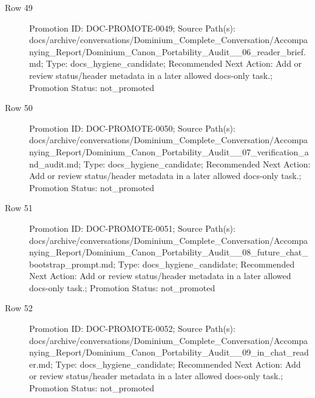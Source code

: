 \documentclass[10.5pt,a4paper,openany]{book}
\begin{document}
\begin{description}
\item[Row 49] Promotion ID: DOC-\allowbreak{}PROMOTE-\allowbreak{}0049; Source Path(s): docs/\allowbreak{}archive/\allowbreak{}conversations/\allowbreak{}Dominium\_\allowbreak{}Complete\_\allowbreak{}Conversation/\allowbreak{}Accompanying\_\allowbreak{}Report/\allowbreak{}Dominium\_\allowbreak{}Canon\_\allowbreak{}Portability\_\allowbreak{}Audit\_\allowbreak{}\_\allowbreak{}06\_\allowbreak{}reader\_\allowbreak{}brief.\allowbreak{}md; Type: docs\_\allowbreak{}hygiene\_\allowbreak{}candidate; Recommended Next Action: Add or review status/\allowbreak{}header metadata in a later allowed docs-\allowbreak{}only task.\allowbreak{}; Promotion Status: not\_\allowbreak{}promoted
\item[Row 50] Promotion ID: DOC-\allowbreak{}PROMOTE-\allowbreak{}0050; Source Path(s): docs/\allowbreak{}archive/\allowbreak{}conversations/\allowbreak{}Dominium\_\allowbreak{}Complete\_\allowbreak{}Conversation/\allowbreak{}Accompanying\_\allowbreak{}Report/\allowbreak{}Dominium\_\allowbreak{}Canon\_\allowbreak{}Portability\_\allowbreak{}Audit\_\allowbreak{}\_\allowbreak{}07\_\allowbreak{}verification\_\allowbreak{}and\_\allowbreak{}audit.\allowbreak{}md; Type: docs\_\allowbreak{}hygiene\_\allowbreak{}candidate; Recommended Next Action: Add or review status/\allowbreak{}header metadata in a later allowed docs-\allowbreak{}only task.\allowbreak{}; Promotion Status: not\_\allowbreak{}promoted
\item[Row 51] Promotion ID: DOC-\allowbreak{}PROMOTE-\allowbreak{}0051; Source Path(s): docs/\allowbreak{}archive/\allowbreak{}conversations/\allowbreak{}Dominium\_\allowbreak{}Complete\_\allowbreak{}Conversation/\allowbreak{}Accompanying\_\allowbreak{}Report/\allowbreak{}Dominium\_\allowbreak{}Canon\_\allowbreak{}Portability\_\allowbreak{}Audit\_\allowbreak{}\_\allowbreak{}08\_\allowbreak{}future\_\allowbreak{}chat\_\allowbreak{}bootstrap\_\allowbreak{}prompt.\allowbreak{}md; Type: docs\_\allowbreak{}hygiene\_\allowbreak{}candidate; Recommended Next Action: Add or review status/\allowbreak{}header metadata in a later allowed docs-\allowbreak{}only task.\allowbreak{}; Promotion Status: not\_\allowbreak{}promoted
\item[Row 52] Promotion ID: DOC-\allowbreak{}PROMOTE-\allowbreak{}0052; Source Path(s): docs/\allowbreak{}archive/\allowbreak{}conversations/\allowbreak{}Dominium\_\allowbreak{}Complete\_\allowbreak{}Conversation/\allowbreak{}Accompanying\_\allowbreak{}Report/\allowbreak{}Dominium\_\allowbreak{}Canon\_\allowbreak{}Portability\_\allowbreak{}Audit\_\allowbreak{}\_\allowbreak{}09\_\allowbreak{}in\_\allowbreak{}chat\_\allowbreak{}reader.\allowbreak{}md; Type: docs\_\allowbreak{}hygiene\_\allowbreak{}candidate; Recommended Next Action: Add or review status/\allowbreak{}header metadata in a later allowed docs-\allowbreak{}only task.\allowbreak{}; Promotion Status: not\_\allowbreak{}promoted

\end{description}
\end{document}
